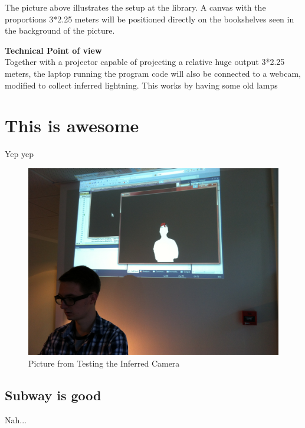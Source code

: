 The picture above illustrates the setup at the library. A canvas with the proportions 3*2.25 meters will be positioned directly on the bookshelves seen in the background of the picture.

\textbf{Technical Point of view}\\
Together with a projector capable of projecting a relative huge output 3*2.25 meters, the laptop running the program code will also be connected to a webcam, modified to collect inferred lightning. This works by having some old lamps 


     


\section{This is awesome}
Yep yep

\begin{figure}[htbp]
\centering
\includegraphics[width=1.00\textwidth]{Pictures/Test/IMG_1477.jpg}
\caption{Picture from Testing the Inferred Camera}
\label{fig:Picture from Testing the Inferred Camera}
\end{figure}

\subsection{Subway is good}
Nah...